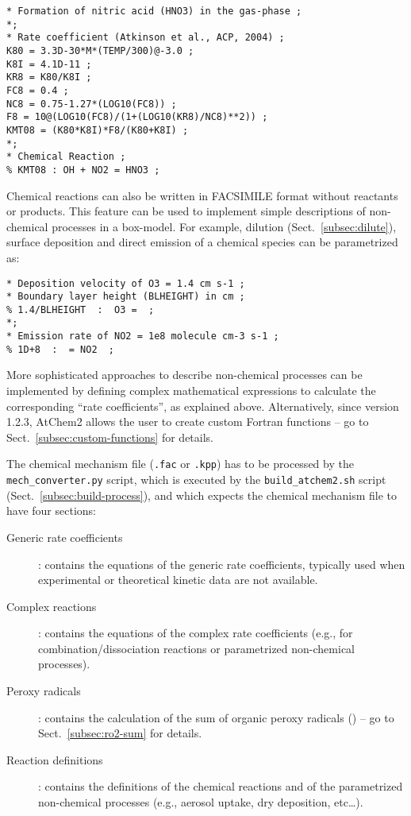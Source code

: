 \begin{verbatim}
* Formation of nitric acid (HNO3) in the gas-phase ;
*;
* Rate coefficient (Atkinson et al., ACP, 2004) ;
K80 = 3.3D-30*M*(TEMP/300)@-3.0 ;
K8I = 4.1D-11 ;
KR8 = K80/K8I ;
FC8 = 0.4 ;
NC8 = 0.75-1.27*(LOG10(FC8)) ;
F8 = 10@(LOG10(FC8)/(1+(LOG10(KR8)/NC8)**2)) ;
KMT08 = (K80*K8I)*F8/(K80+K8I) ;
*;
* Chemical Reaction ;
% KMT08 : OH + NO2 = HNO3 ;
\end{verbatim}

Chemical reactions can also be written in FACSIMILE format without
reactants or products. This feature can be used to implement simple
descriptions of non-chemical processes in a box-model. For example,
dilution (Sect.~\ref{subsec:dilute}), surface deposition and direct
emission of a chemical species can be parametrized as:

\begin{verbatim}
* Deposition velocity of O3 = 1.4 cm s-1 ;
* Boundary layer height (BLHEIGHT) in cm ;
% 1.4/BLHEIGHT  :  O3 =  ;
*;
* Emission rate of NO2 = 1e8 molecule cm-3 s-1 ;
% 1D+8  :  = NO2  ;
\end{verbatim}

More sophisticated approaches to describe non-chemical processes can
be implemented by defining complex mathematical expressions to
calculate the corresponding ``rate coefficients'', as explained
above. Alternatively, since version 1.2.3, AtChem2 allows the user to
create custom Fortran functions -- go to Sect.~\ref{subsec:custom-functions}
for details.

The chemical mechanism file (\texttt{.fac} or \texttt{.kpp}) has to be
processed by the \texttt{mech\_converter.py} script, which is executed
by the \texttt{build\_atchem2.sh} script (Sect.~\ref{subsec:build-process}),
and which expects the chemical mechanism file to have four sections:

\begin{description}
\item[Generic rate coefficients]: contains the equations of the
  generic rate coefficients, typically used when experimental or
  theoretical kinetic data are not available.
\item[Complex reactions]: contains the equations of the complex rate
  coefficients (e.g., for combination/dissociation reactions or
  parametrized non-chemical processes).
\item[Peroxy radicals]: contains the calculation of the sum of organic
  peroxy radicals () -- go to Sect.~\ref{subsec:ro2-sum} for
  details.
\item[Reaction definitions]: contains the definitions of the chemical
  reactions and of the parametrized non-chemical processes (e.g.,
  aerosol uptake, dry deposition, etc\ldots).
\end{description}

